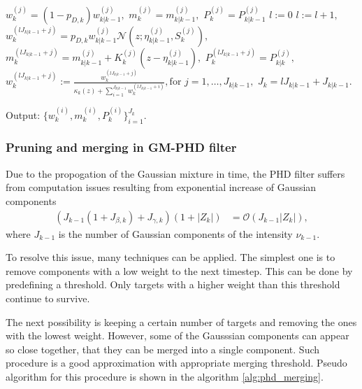 \begin{algorithm}[h]
\begin{algorithmic}[1]
        \State
         
            \State $w_k^{(j)} = (1 - p_{D,k}) w_{k|k-1}^{(j)},$ \quad
             $m_k^{(j)} = m_{k|k-1}^{(j)},$ \quad
             $P_k^{(j)} = P_{k|k-1}^{(j)}$
        \EndFor
        \State $l:=0$
         
            \State $l:=l+1,$
                \State $w_k^{(l J_{k|k-1} + j)} = p_{D,k} w_{k|k-1}^{(j)} \mathcal{N}(z; \eta_{k|k-1}^{(j)},S_k^{(j)}),$
                \State $m_k^{(l J_{k|k-1} + j)} = m_{k|k-1}^{(j)} + K_k^{(j)} (z - \eta_{k|k-1}^{(j)}),$
                \State $P_k^{(l J_{k|k-1} + j)} = P_{k|k}^{(j)},$
            \EndFor
        \State $w_k^{(l J_{k|k-1} + j)} := \frac{w_k^{(l J_{k|k-1} + j)}}{\kappa_k(z) + \sum_{i=1}^{J_{k|k-1}} w_k^{(
            l J_{k|k-1} + i)}}, \text{for $j = 1,\dots,J_{k|k-1}$},$
        \EndFor
        \State $J_k = l J_{k|k-1} + J_{k|k-1}.$
        \EndProcedure

        \State Output: $\{ w_k^{(i)}, m_k^{(i)}, P_k^{(i)} \}_{i=1}^{J_k}$.
    \end{algorithmic}
    \label{alg:phd}
\end{algorithm}

        \subsubsection{Pruning and merging in GM-PHD filter}
Due to the propogation of the Gaussian mixture in time, the PHD filter suffers from computation issues resulting from exponential increase of Gaussian components
\begin{align}
(J_{k-1} (1 + J_{\beta,k}) + J_{\gamma,k}) (1 + |Z_k|) &= \mathcal{O}(J_{k-1} |Z_k|),
\end{align}
where $J_{k-1}$ is the number of Gaussian components of the intensity $\nu_{k-1}$.

To resolve this issue, many techniques can be applied. The simplest one is to remove components with a low weight to the next timestep. This can be done by predefining a threshold. Only targets with a higher weight than this threshold continue to survive.

The next possibility is keeping a certain number of targets and removing the ones with the lowest weight. However, some of the Gausssian components can appear so close together, that they can be merged into a single component. Such procedure is a good approximation with appropriate merging threshold. Pseudo algorithm for this procedure is shown in the algorithm \ref{alg:phd_merging}.

